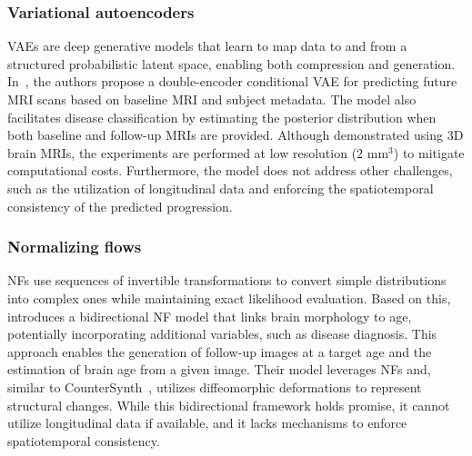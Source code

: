 \subsubsection{Variational autoencoders}
VAEs are deep generative models that learn to map data to and from a structured probabilistic latent space, enabling both compression and generation. In~\citep{he2024individualized}, the authors propose a double-encoder conditional VAE for predicting future MRI scans based on baseline MRI and subject metadata. The model also facilitates disease classification by estimating the posterior distribution when both baseline and follow-up MRIs are provided. Although demonstrated using 3D brain MRIs, the experiments are performed at low resolution ($2\text{ mm}^3$) to mitigate computational costs. Furthermore, the model does not address other challenges, such as the utilization of longitudinal data and enforcing the spatiotemporal consistency of the predicted progression.

\subsubsection{Normalizing flows}
NFs use sequences of invertible transformations to convert simple distributions into complex ones while maintaining exact likelihood evaluation. Based on this, \citep{wilms2022invertible} introduces a bidirectional NF model that links brain morphology to age, potentially incorporating additional variables, such as disease diagnosis. This approach enables the generation of follow-up images at a target age and the estimation of brain age from a given image. Their model leverages NFs and, similar to CounterSynth~\citep{pombo2023equitable}, utilizes diffeomorphic deformations to represent structural changes. While this bidirectional framework holds promise, it cannot utilize longitudinal data if available, and it lacks mechanisms to enforce spatiotemporal consistency.


